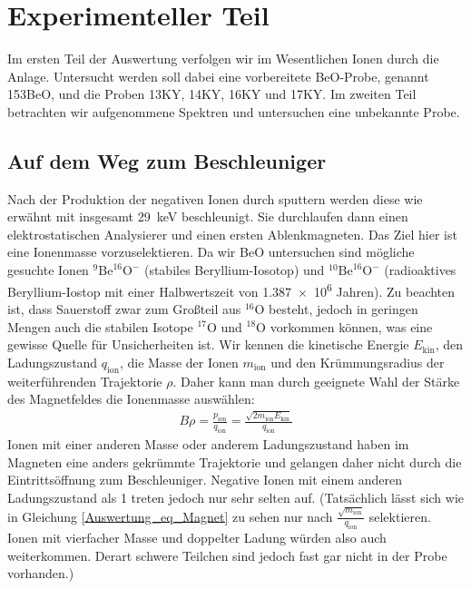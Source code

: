 \section{Experimenteller Teil}
Im ersten Teil der Auswertung verfolgen wir im Wesentlichen Ionen durch die Anlage.
Untersucht werden soll dabei eine vorbereitete BeO-Probe, genannt \glqq 153BeO\grqq{}, und die Proben \glqq 13KY\grqq{}, \glqq 14KY\grqq{}, \glqq 16KY\grqq{} und \glqq 17KY\grqq{}.
Im zweiten Teil betrachten wir aufgenommene Spektren und untersuchen eine unbekannte Probe.

\subsection{Auf dem Weg zum Beschleuniger}
Nach der Produktion der negativen Ionen durch sputtern werden diese wie erwähnt mit insgesamt \SI{29}{\kilo\electronvolt} beschleunigt.
Sie durchlaufen dann einen elektrostatischen Analysierer und einen ersten Ablenkmagneten.
Das Ziel hier ist eine Ionenmasse vorzuselektieren.
Da wir BeO untersuchen sind mögliche gesuchte Ionen $^{9}\text{Be}^{16}\text{O}^{-}$ (stabiles Beryllium-Iosotop) und $^{10}\text{Be}^{16}\text{O}^{-}$ (radioaktives Beryllium-Iostop mit einer Halbwertszeit von \num{1.387e6} Jahren).
Zu beachten ist, dass Sauerstoff zwar zum Großteil aus $^{16}$O besteht, jedoch in geringen Mengen auch die stabilen Isotope $^{17}$O und $^{18}$O vorkommen können, was eine gewisse Quelle für Unsicherheiten ist.
Wir kennen die kinetische Energie $E_{\text{kin}}$, den Ladungszustand $q_{\text{ion}}$, die Masse der Ionen $m_{\text{ion}}$ und den Krümmungsradius der weiterführenden Trajektorie $\rho$.
Daher kann man durch geeignete Wahl der Stärke des Magnetfeldes die Ionenmasse auswählen:
\begin{gather}
    B \rho = \frac{p_{\text{ion}}}{q_{\text{ion}}} = \frac{\sqrt{2m_{\text{ion}}E_{\text{kin}}}}{q_{\text{ion}}}
    \label{Auswertung_eq_Magnet}
\end{gather}
Ionen mit einer anderen Masse oder anderem Ladungszustand haben im Magneten eine anders gekrümmte Trajektorie und gelangen daher nicht durch die Eintrittsöffnung zum Beschleuniger.
Negative Ionen mit einem anderen Ladungszustand als 1 treten jedoch nur sehr selten auf.
(Tatsächlich lässt sich wie in Gleichung \ref{Auswertung_eq_Magnet} zu sehen nur nach $\frac{\sqrt{m_{\text{ion}}}}{q_{\text{ion}}}$ selektieren.
Ionen mit vierfacher Masse und doppelter Ladung würden also auch weiterkommen. Derart schwere Teilchen sind jedoch fast gar nicht in der Probe vorhanden.)
